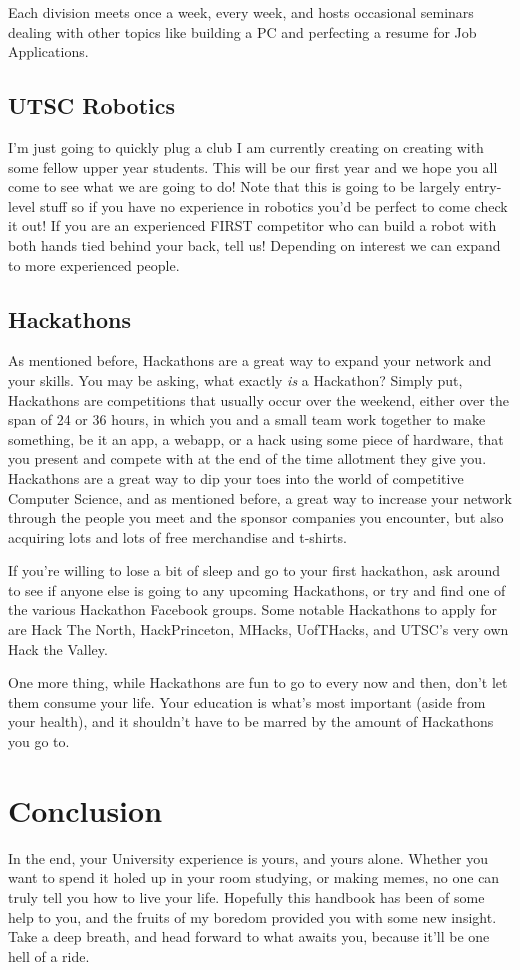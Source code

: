 \documentclass[11pt]{article}
\begin{document}
Each division meets once a week, every week, and hosts occasional
seminars dealing with other topics like building a PC and perfecting a
resume for Job Applications.

\subsection{UTSC Robotics}
I'm just going to quickly plug a club I am currently creating on
creating with some fellow upper year students. This will be our first
year and we hope you all come to see what we are going to do! Note
that this is going to be largely entry-level stuff so if you have no
experience in robotics you'd be perfect to come check it out! If you are
an experienced FIRST competitor who can build a robot with both hands
tied behind your back, tell us! Depending on interest we can expand to
more experienced people.

\subsection{Hackathons}
As mentioned before, Hackathons are a great way to expand your network
and your skills. You may be asking, what exactly \textit{is} a
Hackathon? Simply put, Hackathons are competitions that usually occur
over the weekend, either over the span of 24 or 36 hours, in which
you and a small team work together to make something, be it an app, a
webapp, or a hack using some piece of hardware, that you present and
compete with at the end of the time allotment they give you. Hackathons
are a great way to dip your toes into the world of competitive Computer
Science, and as mentioned before, a great way to increase your network
through the people you meet and the sponsor companies you encounter, but
also acquiring lots and lots of free merchandise and t-shirts.

If you're willing to lose a bit of sleep and go to your first hackathon,
ask around to see if anyone else is going to any upcoming Hackathons, or
try and find one of the various Hackathon Facebook groups. Some notable
Hackathons to apply for are Hack The North, HackPrinceton, MHacks,
UofTHacks, and UTSC's very own Hack the Valley.

One more thing, while Hackathons are fun to go to every now and then,
don't let them consume your life. Your education is what's most
important (aside from your health), and it shouldn't have to be marred
by the amount of Hackathons you go to.

\section{Conclusion}
In the end, your University experience is yours, and yours alone.
Whether you want to spend it holed up in your room studying, or making
memes, no one can truly tell you how to live your life. Hopefully this
handbook has been of some help to you, and the fruits of my boredom
provided you with some new insight. Take a deep breath, and head forward
to what awaits you, because it'll be one hell of a ride.
\end{document}
